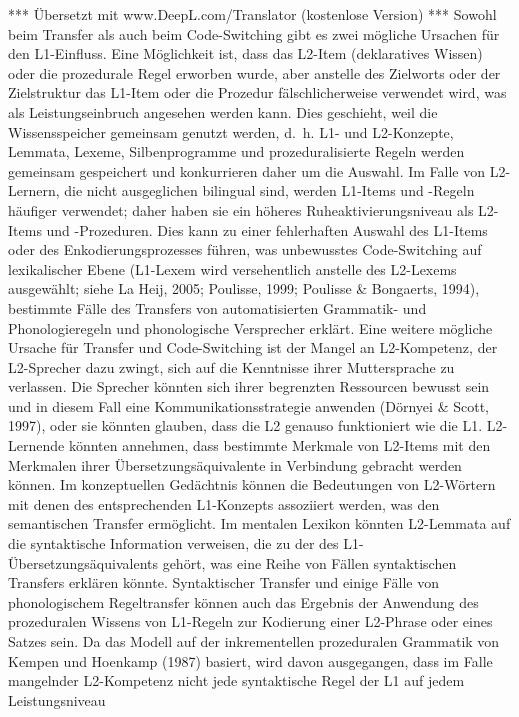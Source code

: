 \documentclass[
  letterpaper,
]{scrbook}
\begin{document}
*** Übersetzt mit www.DeepL.com/Translator (kostenlose Version) ***
Sowohl beim Transfer als auch beim Code-Switching gibt es zwei mögliche
Ursachen für den L1-Einfluss. Eine Möglichkeit ist, dass das L2-Item
(deklaratives Wissen) oder die prozedurale Regel erworben wurde, aber
anstelle des Zielworts oder der Zielstruktur das L1-Item oder die
Prozedur fälschlicherweise verwendet wird, was als Leistungseinbruch
angesehen werden kann. Dies geschieht, weil die Wissensspeicher
gemeinsam genutzt werden, d.~h. L1- und L2-Konzepte, Lemmata, Lexeme,
Silbenprogramme und prozeduralisierte Regeln werden gemeinsam
gespeichert und konkurrieren daher um die Auswahl. Im Falle von
L2-Lernern, die nicht ausgeglichen bilingual sind, werden L1-Items und
-Regeln häufiger verwendet; daher haben sie ein höheres
Ruheaktivierungsniveau als L2-Items und -Prozeduren. Dies kann zu einer
fehlerhaften Auswahl des L1-Items oder des Enkodierungsprozesses führen,
was unbewusstes Code-Switching auf lexikalischer Ebene (L1-Lexem wird
versehentlich anstelle des L2-Lexems ausgewählt; siehe La Heij, 2005;
Poulisse, 1999; Poulisse \& Bongaerts, 1994), bestimmte Fälle des
Transfers von automatisierten Grammatik- und Phonologieregeln und
phonologische Versprecher erklärt. Eine weitere mögliche Ursache für
Transfer und Code-Switching ist der Mangel an L2-Kompetenz, der
L2-Sprecher dazu zwingt, sich auf die Kenntnisse ihrer Muttersprache zu
verlassen. Die Sprecher könnten sich ihrer begrenzten Ressourcen bewusst
sein und in diesem Fall eine Kommunikationsstrategie anwenden (Dörnyei
\& Scott, 1997), oder sie könnten glauben, dass die L2 genauso
funktioniert wie die L1. L2-Lernende könnten annehmen, dass bestimmte
Merkmale von L2-Items mit den Merkmalen ihrer Übersetzungsäquivalente in
Verbindung gebracht werden können. Im konzeptuellen Gedächtnis können
die Bedeutungen von L2-Wörtern mit denen des entsprechenden L1-Konzepts
assoziiert werden, was den semantischen Transfer ermöglicht. Im mentalen
Lexikon könnten L2-Lemmata auf die syntaktische Information verweisen,
die zu der des L1-Übersetzungsäquivalents gehört, was eine Reihe von
Fällen syntaktischen Transfers erklären könnte. Syntaktischer Transfer
und einige Fälle von phonologischem Regeltransfer können auch das
Ergebnis der Anwendung des prozeduralen Wissens von L1-Regeln zur
Kodierung einer L2-Phrase oder eines Satzes sein. Da das Modell auf der
inkrementellen prozeduralen Grammatik von Kempen und Hoenkamp (1987)
basiert, wird davon ausgegangen, dass im Falle mangelnder L2-Kompetenz
nicht jede syntaktische Regel der L1 auf jedem Leistungsniveau
\end{document}
